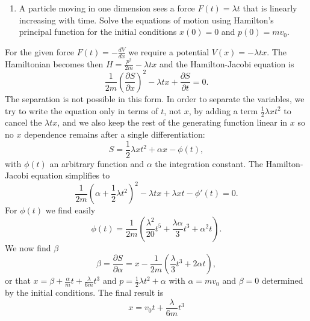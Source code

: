 \documentclass[letterpaper,11pt]{article}
\begin{document}
\begin{enumerate}[resume]
 \item A particle moving in one dimension sees a force $F(t) = \lambda t$ that is linearly increasing with time.  Solve the equations of motion using Hamilton's principal function for the initial conditions $x(0) = 0$ and $p(0) = mv_0$.
\end{enumerate}
For the given force $F(t) = -\frac{dV}{dx}$ we require a potential $V(x) = -\lambda tx$.  The Hamiltonian becomes then $H = \frac{p^2}{2m} - \lambda tx$ and the Hamilton-Jacobi equation is
\begin{equation*}
 \frac{1}{2m}\left(\frac{\partial S}{\partial x}\right)^2 - \lambda tx + \frac{\partial S}{\partial t} = 0.
\end{equation*}
The separation is not possible in this form.  In order to separate the variables, we try to write the equation only in terms of $t$, not $x$, by adding a term $\frac{1}{2} \lambda xt^2$ to cancel the $\lambda tx$, and we also keep the rest of the generating function linear in $x$ so no $x$ dependence remains after a single differentiation:
\begin{equation*}
 S = \frac{1}{2} \lambda xt^2 + \alpha x - \phi(t),
\end{equation*}
with $\phi(t)$ an arbitrary function and $\alpha$ the integration constant.  The Hamilton-Jacobi equation simplifies to
\begin{equation*}
 \frac{1}{2m} \left( \alpha + \frac{1}{2} \lambda t^2 \right)^2 - \lambda tx + \lambda xt - \phi'(t) = 0.
\end{equation*}
For $\phi(t)$ we find easily
\begin{equation*}
 \phi(t) = \frac{1}{2m} \left( \frac{\lambda^2}{20} t^5 + \frac{\lambda \alpha}{3} t^3 + \alpha^2 t \right).
\end{equation*}
We now find $\beta$
\begin{equation*}
 \beta = \frac{\partial S}{\partial \alpha} = x - \frac{1}{2m} \left(\frac{\lambda}{3} t^3 + 2 \alpha t \right),
\end{equation*}
or that $x = \beta + \frac{\alpha}{m} t + \frac{\lambda}{6m} t^3$ and $p = \frac{1}{2}\lambda t^2 + \alpha$ with $\alpha = mv_0$ and $\beta = 0$ determined by the initial conditions.  The final result is
\begin{equation*}
 x = v_0 t + \frac{\lambda}{6m} t^3
\end{equation*}
\end{document}

